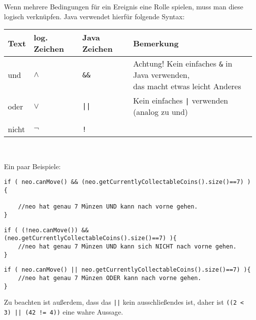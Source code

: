 \begin{Infobox}

	Wenn mehrere Bedingungen für ein Ereignis eine Rolle spielen, muss man diese logisch verknüpfen.
	Java verwendet hierfür folgende Syntax:
	\begin{center}
		\begin{tabular}{ l | l | l | l}
			Text & log. Zeichen & Java Zeichen & Bemerkung \\ \hline
			und  & $\land$ & \texttt{\&\&} & \minibox{
					Achtung! Kein einfaches \texttt{\&} in Java verwenden,\\
					das macht etwas leicht Anderes
			} \\
			oder & $\lor$ & \texttt{||} & Kein einfaches \texttt{|} verwenden (analog zu und) \\
			& &  \\
			nicht & $\neg$ & \texttt{!} &\\
		\end{tabular}\\
	\end{center}

	Ein paar Beispiele:

	\begin{lstlisting}[numbers=none]
if ( neo.canMove() && (neo.getCurrentlyCollectableCoins().size()==7) ){

	//neo hat genau 7 Münzen UND kann nach vorne gehen.
}
	\end{lstlisting}

	\begin{lstlisting}[numbers=none]
if ( (!neo.canMove()) && (neo.getCurrentlyCollectableCoins().size()==7) ){
	//neo hat genau 7 Münzen UND kann sich NICHT nach vorne gehen.
}
	\end{lstlisting}

	\begin{lstlisting}[numbers=none]
if ( neo.canMove() || neo.getCurrentlyCollectableCoins().size()==7) ){
	//neo hat genau 7 Münzen ODER kann nach vorne gehen.
}
	\end{lstlisting}

	Zu beachten ist außerdem, dass das  \lstinline{||} kein ausschließendes  ist, daher ist \lstinline{((2 < 3) || (42 != 4))} eine wahre Aussage.

\end{Infobox}


